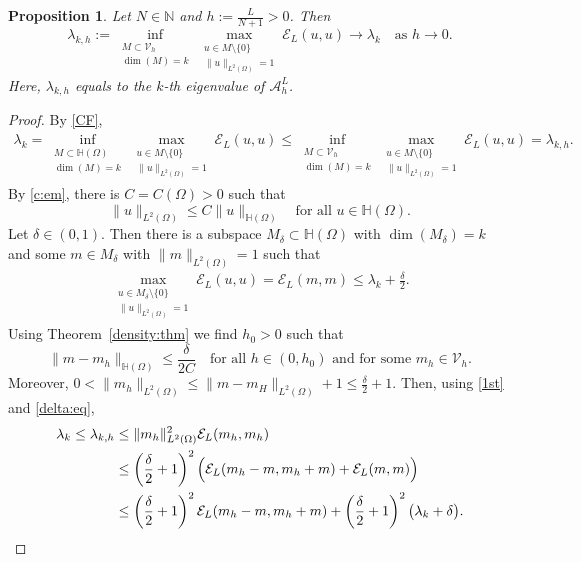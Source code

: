 \documentclass[10 pt]{article}
\newtheorem{proposition}[theorem]{Proposition}
\numberwithin{equation}{section}
\def\mH{\mathbb{H}}
\begin{document}
\begin{proposition}\label{prop:eigen-approx}
Let $N\in \mathbb N$ and $h:=\frac{L}{N+1}>0$. Then
$$
\lambda_{k,h}:=\inf_{\substack{M\subset \mathcal{V}_{h}\\ \dim(M)=k}} \max_{\substack{u\in M\setminus\{0\}\\ \|u\|_{L^2(\Omega)}=1}} \mathcal{E}_L(u,u)\to \lambda_k\quad\text{as $h\to 0$.}
$$
Here, $\lambda_{k,h}$ equals to the $k$-th eigenvalue of $\mathcal{A}^L_{h}$.
\end{proposition}
\begin{proof}
By \eqref{CF}, 
\begin{align}\label{1st}
\lambda_k=\inf_{\substack{M\subset \mH(\Omega)\\ \dim(M)=k}} \max_{\substack{u\in M\setminus\{0\}\\ \|u\|_{L^2(\Omega)}=1}} \mathcal{E}_L(u,u)\leq \inf_{\substack{M\subset \mathcal{V}_{h}\\ \dim(M)=k}} \max_{\substack{u\in M\setminus\{0\}\\ \|u\|_{L^2(\Omega)}=1}} \mathcal{E}_L(u,u)=\lambda_{k,h}. 
\end{align}
 By \eqref{c:em}, there is $C=C(\Omega)>0$ such that 
$$
\|u\|_{L^2(\Omega)}\leq C\|u\|_{\mH(\Omega)}\quad\text{for all $u\in \mH(\Omega)$.}
$$
Let  $\delta\in(0,1)$. Then there is a subspace $M_{\delta}\subset \mH(\Omega)$ with $\dim(M_{\delta})=k$ and some $m\in M_{\delta}$ with $\|m\|_{L^2(\Omega)}=1$ such that
\begin{align}\label{delta:eq}
\max_{\substack{ u\in M_{\delta}\setminus \{0\}\\ \|u\|_{L^2(\Omega)}=1}} \mathcal{E}_L(u,u)=\mathcal{E}_{L}(m,m)\leq \lambda_k+\frac{\delta}{2}. 
\end{align}
Using Theorem~\ref{density:thm} we find $h_0>0$ such that
$$
\|m-m_h\|_{\mH(\Omega)}\leq \frac{\delta}{2C} \quad\text{for all $h\in(0,h_0)$ and for some $m_h\in {\mathcal V}_h$}.
$$
Moreover, $0<\|m_h\|_{L^2(\Omega)}\leq \|m-m_H\|_{L^2(\Omega)}+1\leq \frac{\delta}{2}+1
$. Then, using \eqref{1st} and \eqref{delta:eq},
\begin{align}\notag 
\lambda_{k}\leq \lambda_{k,h}&\leq \|m_h\|_{L^2(\Omega)}^2 \mathcal{E}_L(m_h,m_h)\\
&\leq \left( \frac{\delta}{2}+1\right)^2\Big(\mathcal{E}_L(m_h-m,m_h+m)+\mathcal{E}_L(m,m)\Big)\notag\\
&\leq \left( \frac{\delta}{2}+1\right)^2\mathcal{E}_L(m_h-m,m_h+m)
+\left( \frac{\delta}{2}+1\right)^2\big(\lambda_k+\delta\big).\label{lambda-k-upperbound}

\end{align}
\end{proof}
\end{document}
